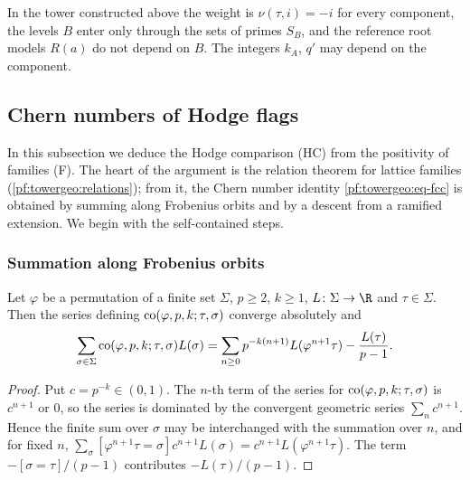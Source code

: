 \begin{remark}\label{pf:towergeo:rem-tower}
In the tower constructed above the weight is $\nu(\tau,i)=-i$ for every component, the levels $B$ enter
only through the sets of primes $S_B$, and the reference root models $R(a)$ do not depend on $B$. The
integers $k_A$, $q'$ may depend on the component.
\end{remark}

\subsection{Chern numbers of Hodge flags}\label{pf:towergeo:sec-hodge}

In this subsection we deduce the Hodge comparison (HC) from the positivity of families (F). The heart of
the argument is the relation theorem for lattice families (\cref{pf:towergeo:relations}); from it, the
Chern number identity \eqref{pf:towergeo:eq-fcc} is obtained by summing along Frobenius orbits and by a
descent from a ramified extension. We begin with the self-contained steps.

\subsubsection*{Summation along Frobenius orbits}

\begin{lemma}\label{pf:towergeo:co-series}
Let $\varphi$ be a permutation of a finite set $\Sigma$, $p\ge2$, $k\ge1$, $L\colon\Sigma\to\R$ and
$\tau\in\Sigma$. Then the series defining $\operatorname{co}(\varphi,p,k;\tau,\sigma)$ converge absolutely and
\[
\sum_{\sigma\in\Sigma}\operatorname{co}(\varphi,p,k;\tau,\sigma)L(\sigma)=\sum_{n\ge0}p^{-k(n+1)}L(\varphi^{n+1}\tau)-\frac{L(\tau)}{p-1}.
\]
\end{lemma}

\begin{proof}
Put $c=p^{-k}\in(0,1)$. The $n$-th term of the series for $\operatorname{co}(\varphi,p,k;\tau,\sigma)$ is $c^{n+1}$
or $0$, so the series is dominated by the convergent geometric series $\sum_nc^{n+1}$. Hence the finite
sum over $\sigma$ may be interchanged with the summation over $n$, and for fixed $n$,
$\sum_\sigma[\varphi^{n+1}\tau=\sigma]c^{n+1}L(\sigma)=c^{n+1}L(\varphi^{n+1}\tau)$. The term
$-[\sigma=\tau]/(p-1)$ contributes $-L(\tau)/(p-1)$.
\end{proof}

